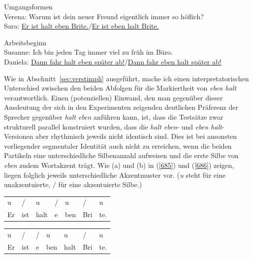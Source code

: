 \begin{exe}
	\ex\label{683} Umgangsformen\\
	Verena: Warum ist dein neuer Freund eigentlich immer so höflich?\\
	Sara: \underline{Er ist halt eben Brite.}/\underline{Er ist eben halt Brite.}
\end{exe}

\begin{exe}
	\ex\label{684} Arbeitsbeginn\\
	Susanne: Ich bin jeden Tag immer viel zu früh im Büro.\\
	Daniela: \underline{Dann fahr halt eben später ab!}/\underline{Dann fahr eben halt später ab!}
\end{exe}
Wie in Abschnitt~\ref{sec:verstimpli} ausgeführt, mache ich einen interpretatorischen Unterschied zwischen den beiden Abfolgen für die Markiertheit von \textit{eben halt} verantwortlich. Einen (potenziellen) Einwand, den man gegenüber dieser Ausdeutung der sich in den Experimenten zeigenden deutlichen Präferenz der Sprecher gegenüber \textit{halt eben} anführen kann, ist, dass die Testsätze zwar strukturell pa\-rallel konstruiert wurden, dass die \textit{halt eben}- und \textit{eben halt}-Versionen aber rhythmisch jeweils nicht identisch sind. Dies ist bei ansonsten vorliegender segmentaler Identität auch nicht zu erreichen, wenn die beiden Partikeln eine unterschiedliche Sil\-benanzahl aufweisen und die erste Silbe von \textit{eben} zudem Wortakzent  trägt. Wie (a) und (b) in (\ref{685}) und (\ref{686}) zeigen, liegen folglich jeweils unterschiedliche Akzentmuster vor. (\textit{u} steht für eine unakzentuierte, / für eine akzentuierte Silbe.)

\begin{exe}
	\ex\label{685} 
	\begin{xlist} 
	\ex\label{685a}
	\begin{tabular}[t]{lllllll}
	u & / & u & / & u & / & u\\
	Er & ist & halt & e & ben & Bri & te.
    \end{tabular}
    \ex\label{685b}
	\begin{tabular}[t]{lllllll}
	u & / & / & u & u & / & u\\
	Er & ist & e & ben & halt & Bri & te.
    \end{tabular}
\end{xlist}    
\end{exe}

